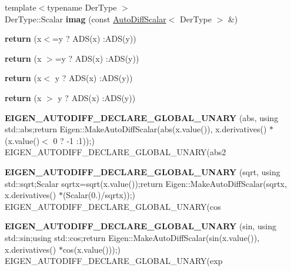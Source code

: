 \begin{DoxyCompactItemize}
\mbox{\label{namespace_eigen_a524f2d0ae40cbbb4f55ea073c98a1c43}} 
{\footnotesize template$<$typename Der\+Type $>$ }\\Der\+Type\+::\+Scalar {\bfseries imag} (const \hyperlink{class_eigen_1_1_auto_diff_scalar}{Auto\+Diff\+Scalar}$<$ Der\+Type $>$ \&)
\item 
\mbox{\label{namespace_eigen_aa0c1fcb4db649060eab9129e41264054}} 
{\bfseries return} (x$<$=y ? A\+DS(x) \+:A\+DS(y))
\item 
\mbox{\label{namespace_eigen_a439cf5f628b806b51886a5fecea7b432}} 
{\bfseries return} (x $>$=y ? A\+DS(x) \+:A\+DS(y))
\item 
\mbox{\label{namespace_eigen_afee0ace8ef902477ddc0fc2f03b60fb6}} 
{\bfseries return} (x$<$ y ? A\+DS(x) \+:A\+DS(y))
\item 
\mbox{\label{namespace_eigen_aeb44f108bee52193ce236a6d6fe703b6}} 
{\bfseries return} (x $>$ y ? A\+DS(x) \+:A\+DS(y))
\item 
\mbox{\label{namespace_eigen_ade972f79dcb91f919a4a9939178e1024}} 
{\bfseries E\+I\+G\+E\+N\+\_\+\+A\+U\+T\+O\+D\+I\+F\+F\+\_\+\+D\+E\+C\+L\+A\+R\+E\+\_\+\+G\+L\+O\+B\+A\+L\+\_\+\+U\+N\+A\+RY} (abs, using std\+::abs;return Eigen\+::\+Make\+Auto\+Diff\+Scalar(abs(x.\+value()), x.\+derivatives() $\ast$(x.\+value()$<$ 0 ? -\/1 \+:1));) E\+I\+G\+E\+N\+\_\+\+A\+U\+T\+O\+D\+I\+F\+F\+\_\+\+D\+E\+C\+L\+A\+R\+E\+\_\+\+G\+L\+O\+B\+A\+L\+\_\+\+U\+N\+A\+RY(abs2
\item 
\mbox{\label{namespace_eigen_ac14347a3d067977f2be8b1c258706ecb}} 
{\bfseries E\+I\+G\+E\+N\+\_\+\+A\+U\+T\+O\+D\+I\+F\+F\+\_\+\+D\+E\+C\+L\+A\+R\+E\+\_\+\+G\+L\+O\+B\+A\+L\+\_\+\+U\+N\+A\+RY} (sqrt, using std\+::sqrt;Scalar sqrtx=sqrt(x.\+value());return Eigen\+::\+Make\+Auto\+Diff\+Scalar(sqrtx, x.\+derivatives() $\ast$(Scalar(0.)/sqrtx));) E\+I\+G\+E\+N\+\_\+\+A\+U\+T\+O\+D\+I\+F\+F\+\_\+\+D\+E\+C\+L\+A\+R\+E\+\_\+\+G\+L\+O\+B\+A\+L\+\_\+\+U\+N\+A\+RY(cos
\item 
\mbox{\label{namespace_eigen_a76fe7d2b9e95853eb56a075380661309}} 
{\bfseries E\+I\+G\+E\+N\+\_\+\+A\+U\+T\+O\+D\+I\+F\+F\+\_\+\+D\+E\+C\+L\+A\+R\+E\+\_\+\+G\+L\+O\+B\+A\+L\+\_\+\+U\+N\+A\+RY} (sin, using std\+::sin;using std\+::cos;return Eigen\+::\+Make\+Auto\+Diff\+Scalar(sin(x.\+value()), x.\+derivatives() $\ast$cos(x.\+value()));) E\+I\+G\+E\+N\+\_\+\+A\+U\+T\+O\+D\+I\+F\+F\+\_\+\+D\+E\+C\+L\+A\+R\+E\+\_\+\+G\+L\+O\+B\+A\+L\+\_\+\+U\+N\+A\+RY(exp

\end{DoxyCompactItemize}
